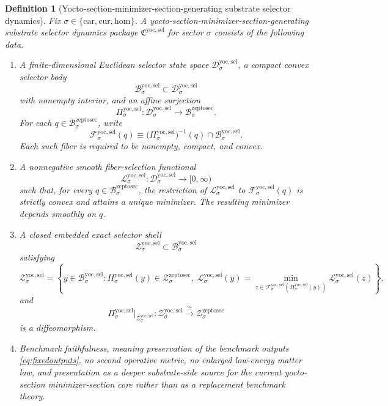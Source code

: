 \documentclass[11pt]{article}
\newcommand{\Car}{\mathrm{car}}
\newcommand{\Cur}{\mathrm{cur}}
\newcommand{\Hom}{\mathrm{hom}}
\newcommand{\ZeptoSectionBody}[1]{\mathcal B_{#1}^{\mathrm{zeptosec}}}
\newcommand{\ZeptoSectionShell}[1]{\mathcal Z_{#1}^{\mathrm{zeptosec}}}
\newcommand{\YoctoSelectorPackage}{\mathfrak C^{\mathrm{yoc,sel}}}
\newcommand{\YoctoSelectorSpace}[1]{\mathcal D_{#1}^{\mathrm{yoc,sel}}}
\newcommand{\YoctoSelectorBody}[1]{\mathcal B_{#1}^{\mathrm{yoc,sel}}}
\newcommand{\YoctoSelectorProj}[1]{\Pi_{#1}^{\mathrm{yoc,sel}}}
\newcommand{\YoctoSelectorFiber}[2]{\mathcal F_{#1}^{\mathrm{yoc,sel}}(#2)}
\newcommand{\YoctoSelectorFunctional}[1]{\mathscr L_{#1}^{\mathrm{yoc,sel}}}
\newcommand{\YoctoSelectorShell}[1]{\mathcal Z_{#1}^{\mathrm{yoc,sel}}}
\newtheorem{definition}{Definition}
\begin{document}
\begin{definition}[Yocto-section-minimizer-section-generating substrate selector dynamics]
\label{def:selector}
Fix \(\sigma\in\{\Car,\Cur,\Hom\}\). A \emph{yocto-section-minimizer-section-generating substrate selector dynamics package} \(\YoctoSelectorPackage\) for sector \(\sigma\) consists of the following data.
\begin{enumerate}
    \item A finite-dimensional Euclidean selector state space \(\YoctoSelectorSpace{\sigma}\), a compact convex selector body
    \[
    \YoctoSelectorBody{\sigma}\subset\YoctoSelectorSpace{\sigma}
    \]
    with nonempty interior, and an affine surjection
    \[
    \YoctoSelectorProj{\sigma}:\YoctoSelectorSpace{\sigma}\to\ZeptoSectionBody{\sigma}.
    \]
    For each \(q\in\ZeptoSectionBody{\sigma}\), write
    \[
    \YoctoSelectorFiber{\sigma}{q}
    \equiv
    \bigl(\YoctoSelectorProj{\sigma}\bigr)^{-1}(q)\cap\YoctoSelectorBody{\sigma}.
    \]
    Each such fiber is required to be nonempty, compact, and convex.
    \item A nonnegative smooth fiber-selection functional
    \[
    \YoctoSelectorFunctional{\sigma}:\YoctoSelectorSpace{\sigma}\to[0,\infty)
    \]
    such that, for every \(q\in\ZeptoSectionBody{\sigma}\), the restriction of \(\YoctoSelectorFunctional{\sigma}\) to \(\YoctoSelectorFiber{\sigma}{q}\) is strictly convex and attains a unique minimizer. The resulting minimizer depends smoothly on \(q\).
    \item A closed embedded exact selector shell
    \[
    \YoctoSelectorShell{\sigma}\subset\YoctoSelectorBody{\sigma}
    \]
    satisfying
    \[
    \YoctoSelectorShell{\sigma}
    =
    \left\{
    y\in\YoctoSelectorBody{\sigma}:
    \YoctoSelectorProj{\sigma}(y)\in\ZeptoSectionShell{\sigma},
    \;
    \YoctoSelectorFunctional{\sigma}(y)
    =
    \min_{z\in\YoctoSelectorFiber{\sigma}{\YoctoSelectorProj{\sigma}(y)}}
    \YoctoSelectorFunctional{\sigma}(z)
    \right\},
    \]
    and
    \[
    \YoctoSelectorProj{\sigma}\big|_{\YoctoSelectorShell{\sigma}}
    :
    \YoctoSelectorShell{\sigma}\xrightarrow{\cong}\ZeptoSectionShell{\sigma}
    \]
    is a diffeomorphism.
    \item Benchmark faithfulness, meaning preservation of the benchmark outputs \eqref{eq:fixedoutputs}, no second operative metric, no enlarged low-energy matter law, and presentation as a deeper substrate-side source for the current yocto-section minimizer-section core rather than as a replacement benchmark theory.
\end{enumerate}
\end{definition}
\end{document}
